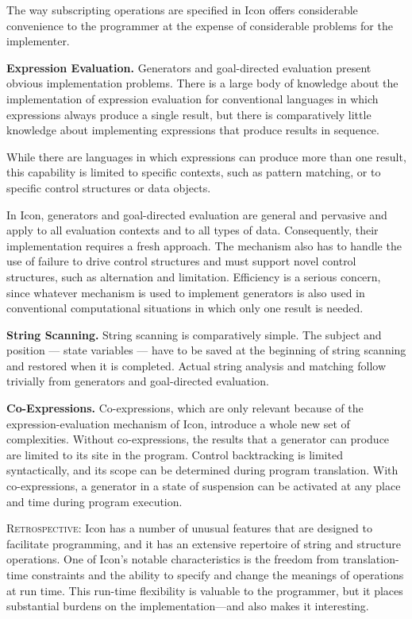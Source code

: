 The way subscripting operations are specified in Icon offers
considerable convenience to the programmer at the expense of
considerable problems for the implementer.


\textbf{Expression Evaluation.} Generators and goal-directed
evaluation present obvious implementation problems. There is a large
body of knowledge about the implementation of expression evaluation
for conventional languages in which expressions always produce a
single result, but there is comparatively little knowledge about
implementing expressions that produce results in sequence.

While there are languages in which expressions can produce more than
one result, this capability is limited to specific contexts, such as
pattern matching, or to specific control structures or data objects.

In Icon, generators and goal-directed evaluation are general and
pervasive and apply to all evaluation contexts and to all types of
data. Consequently, their implementation requires a fresh
approach. The mechanism also has to handle the use of failure to drive
control structures and must support novel control structures, such as
alternation and limitation. Efficiency is a serious concern, since
whatever mechanism is used to implement generators is also used in
conventional computational situations in which only one result is
needed.


\textbf{String Scanning.} String scanning is comparatively simple. The
subject and position --- {\textquotedbl}state variables{\textquotedbl}
--- have to be saved at the beginning of string scanning and restored
when it is completed.  Actual string analysis and matching follow
trivially from generators and goal-directed evaluation.


\textbf{Co-Expressions.} Co-expressions, which are only relevant
because of the expression-evaluation mechanism of Icon, introduce a
whole new set of complexities. Without co-expressions, the results
that a generator can produce are limited to its site in the
program. Control backtracking is limited syntactically, and its scope
can be determined during program translation. With co-expressions, a
generator in a state of suspension can be activated at any place and
time during program execution.


\textsc{Retrospective}: Icon has a number of unusual features that are
designed to facilitate programming, and it has an extensive repertoire
of string and structure operations. One of Icon's notable
characteristics is the freedom from translation-time constraints and
the ability to specify and change the meanings of operations at run
time. This run-time flexibility is valuable to the programmer, but it
places substantial burdens on the implementation---and also makes it
interesting.

